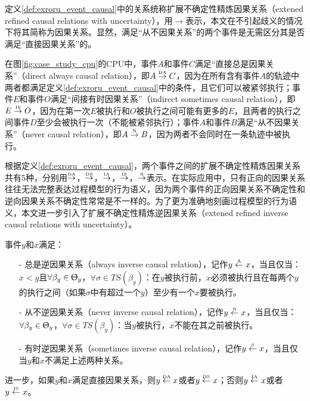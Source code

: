 定义\ref{def:exroru_event_causal}中的关系统称扩展不确定性精炼因果关系（extened refined causal relations with uncertainty），用$\rightarrow$表示，本文在不引起歧义的情况下将其简称为因果关系。显然，满足“从不因果关系”的两个事件是无需区分其是否满足“直接因果关系”的。

\begin{example}\label{ex:exroru_event_causal}
在图\ref{fig:case_study_cpu}的CPU中，事件$A$和事件$C$满足“直接总是因果关系”（direct always causal relation），即$A\overset{\text{\tiny{DA}}}{\rightarrow}C$，因为在所有含有事件$A$的轨迹中两者都满足定义\ref{def:exroru_event_causal}中的条件，且它们可以被紧邻执行；事件$E$和事件$O$满足“间接有时因果关系”（indirect sometimes causal relation），即$E\overset{\text{\tiny{IS}}}{\rightarrow}O$，因为在第一次$E$被执行和$O$被执行之间可能有更多的$E$，且两者的执行之间事件$D$至少会被执行一次（不能被紧邻执行）；事件$A$和事件$B$满足“从不因果关系”（never causal relation），即$A\overset{\text{\tiny{N}}}{\rightarrow}B$，因为两者不会同时在一条轨迹中被执行。
\end{example}

根据定义\ref{def:exroru_event_causal}，两个事件之间的扩展不确定性精炼因果关系共有5种，分别用$\overset{\text{\tiny{DA}}}{\rightarrow}$，$\overset{\text{\tiny{DS}}}{\rightarrow}$，$\overset{\text{\tiny{IA}}}{\rightarrow}$，$\overset{\text{\tiny{IS}}}{\rightarrow}$，$\overset{\text{\tiny{N}}}{\rightarrow}$表示。在实际应用中，只有正向的因果关系往往无法完整表达过程模型的行为语义，因为两个事件的正向因果关系不确定性和逆向因果关系不确定性常常是不一样的。为了更为准确地刻画过程模型的行为语义，本文进一步引入了扩展不确定性精炼逆因果关系（extened refined inverse causal relations with uncertainty）。

\begin{definition}[事件间扩展不确定性精炼逆因果关系]\label{def:exroru_event_inverse_causal}
事件$y$和$x$满足：
  \begin{itemize}
  	\item[-] 总是逆因果关系（always inverse causal relation），记作$y\overset{\text{\tiny{A}}}{\leftarrow}x$，当且仅当：$x<y$且$\forall\beta_{y}\in\Uptheta_{y}$，$\forall\sigma\in TS(\beta_{y})$：在$y$被执行前，$x$必须被执行且在每两个$y$的执行之间（如果$\sigma$中有超过一个$y$）至少有一个$x$要被执行。
  	\item[-] 从不逆因果关系（never inverse causal relation），记作$y\overset{\text{\tiny{N}}}{\leftarrow}x$，当且仅当：$\forall\beta_{y}\in\Uptheta_{y}$，$\forall\sigma\in TS(\beta_{y})$：当$y$被执行，$x$不能在其之前被执行。
  	\item[-] 有时逆因果关系（sometimes inverse causal relation），记作$y\overset{\text{\tiny{S}}}{\leftarrow}x$，当且仅当$y$和$x$不满足上述两种关系。
  \end{itemize}
进一步，如果$y$和$x$满足直接因果关系，则$y\overset{\text{\tiny{DA}}}{\leftarrow}x$或者$y\overset{\text{\tiny{DS}}}{\leftarrow}x$；否则$y\overset{\text{\tiny{IA}}}{\leftarrow}x$或者$y\overset{\text{\tiny{IS}}}{\leftarrow}x$。
\end{definition}

